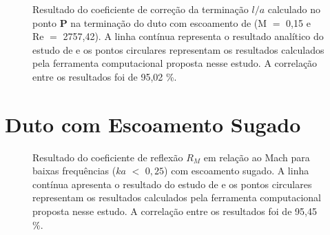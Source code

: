\newpage
\begin{figure}[ht!]
\centering
  \caption[Coeficiente de Correção da Terminação $l/a$ com Escoamento de Exaustão (M $=$ 0,15)]{Resultado do coeficiente de correção da terminação $l/a$ calculado no ponto $\textbf{P}$ na terminação do duto com escoamento de (M $=$ 0,15 e Re $=$ 2757,42). A linha contínua representa o resultado analítico do estudo de  e os pontos circulares representam os resultados calculados pela ferramenta computacional proposta nesse estudo. A correlação entre os resultados foi de 95,02 \%.}
  \label{fig:loa_boca_010}
\end{figure}


\newpage
\section{Duto com Escoamento Sugado}

\begin{figure}[ht!]
\centering
  \caption[Coeficiente de reflexão $R_{M}$ com escoamento sugado]{Resultado do coeficiente de reflexão $R_{M}$ em relação ao Mach para baixas frequências ($ka$ $<$ $0,25$) com escoamento sugado. A linha contínua apresenta o resultado do estudo de  e os pontos circulares representam os resultados calculados pela ferramenta computacional proposta nesse estudo. A correlação entre os resultados foi de 95,45 \%.}

  \label{fig:abs_r_boca_sugado}
\end{figure}

